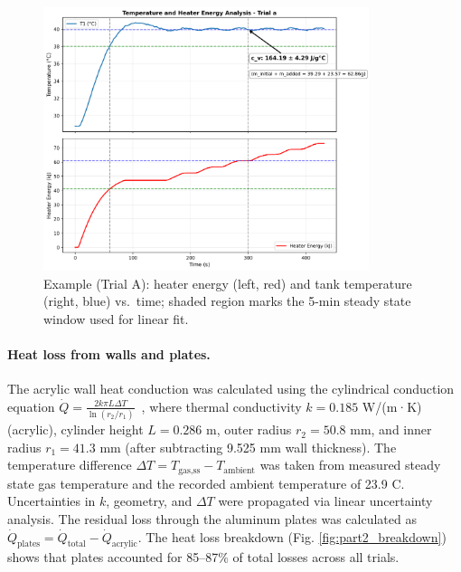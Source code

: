 \documentclass[12pt]{article}
\begin{document}
\begin{figure}[H]
\centering
\includegraphics[width=0.85\textwidth]{graphs/part2_trial_a_temp_heater_energy.png}
\caption{Example (Trial A): heater energy (left, red) and tank temperature (right, blue) vs.\ time; shaded region marks the 5-min steady state window used for linear fit.}
\label{fig:part2_energyfit}
\end{figure}

\paragraph{Heat loss from walls and plates.} The acrylic wall heat conduction was calculated using the cylindrical conduction equation $\dot{Q} = \frac{2k\pi L\Delta T}{\ln(r_2/r_1)}$~\cite{che260_manual}, where thermal conductivity $k = 0.185$ W/(m·K) (acrylic), cylinder height $L = 0.286$ m, outer radius $r_2 = 50.8$ mm, and inner radius $r_1 = 41.3$ mm (after subtracting 9.525 mm wall thickness). The temperature difference $\Delta T = T_{\text{gas,ss}} - T_{\text{ambient}}$ was taken from measured steady state gas temperature and the recorded ambient temperature of 23.9 \textdegree C. Uncertainties in $k$, geometry, and $\Delta T$ were propagated via linear uncertainty analysis. The residual loss through the aluminum plates was calculated as $\dot{Q}_{\text{plates}} = \dot{Q}_{\text{total}} - \dot{Q}_{\text{acrylic}}$. The heat loss breakdown (Fig. \ref{fig:part2_breakdown}) shows that plates accounted for 85–87\% of total losses across all trials.
\end{document}

